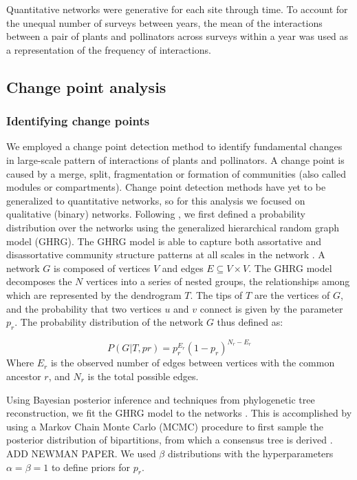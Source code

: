 \documentclass[12pt]{article}
\begin{document}
Quantitative networks were generative for each site through time. To
account for the unequal number of surveys between years, the mean of
the interactions between a pair of plants and pollinators across
surveys within a year was used as a representation of the frequency of
interactions.

\subsection*{Change point analysis}
\subsubsection*{Identifying change points}
We employed a change point detection method \citep{peel2014detecting}
to identify fundamental changes in large-scale pattern of interactions
of plants and pollinators. A change point is caused by a merge, split,
fragmentation or formation of communities (also called modules or
compartments). Change point detection methods have yet to be
generalized to quantitative networks, so for this analysis we focused
on qualitative (binary) networks. Following \cite{peel2014detecting},
we first defined a probability distribution over the networks using
the generalized hierarchical random graph model (GHRG). The GHRG model
is able to capture both assortative and disassortative community
structure patterns at all scales in the network
\citep{peel2014detecting}. A network $G$ is composed of vertices $V$
and edges $E \subseteq {V × V }$. The GHRG model decomposes the $N$
vertices into a series of nested groups, the relationships among which
are represented by the dendrogram $T$. The tips of $T$ are the
vertices of $G$, and the probability that two vertices $u$ and $v$
connect is given by the parameter $p_r$. The probability distribution
of the network $G$ thus defined as:

\begin{equation}
  \label{eq:lik}
  P(G|T,{pr}) = p_r^{E_r}(1-p_r)^{N_r-E_r}
\end{equation}
% 
Where $E_r$ is the observed number of edges between vertices with the
common ancestor $r$, and $N_r$ is the total possible edges.

Using Bayesian posterior inference and techniques from phylogenetic
tree reconstruction, we fit the GHRG model to the networks
\citep{peel2014detecting}. This is accomplished by using a Markov
Chain Monte Carlo (MCMC) procedure to first sample the posterior
distribution of bipartitions, from which a consensus tree is derived
\citep{peel2014detecting}. ADD NEWMAN PAPER. We used $\beta$
distributions with the hyperparameters $\alpha=\beta=1$ to define
priors for $p_r$.
\end{document}
